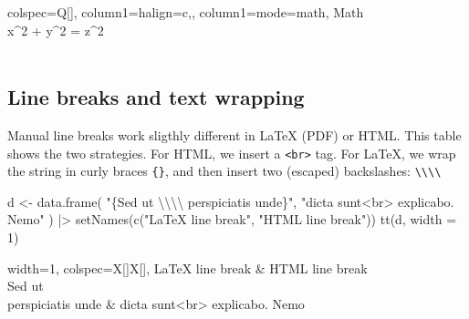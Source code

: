 \documentclass[
  letterpaper,
  DIV=11,
  numbers=noendperiod]{scrartcl}
\newenvironment{Shaded}{\begin{snugshade}}{\end{snugshade}}
\newcommand{\AttributeTok}[1]{\textcolor[rgb]{0.40,0.45,0.13}{#1}}
\newcommand{\DecValTok}[1]{\textcolor[rgb]{0.68,0.00,0.00}{#1}}
\newcommand{\FunctionTok}[1]{\textcolor[rgb]{0.28,0.35,0.67}{#1}}
\newcommand{\NormalTok}[1]{\textcolor[rgb]{0.00,0.23,0.31}{#1}}
\newcommand{\OtherTok}[1]{\textcolor[rgb]{0.00,0.23,0.31}{#1}}
\newcommand{\SpecialCharTok}[1]{\textcolor[rgb]{0.37,0.37,0.37}{#1}}
\newcommand{\StringTok}[1]{\textcolor[rgb]{0.13,0.47,0.30}{#1}}
\begin{document}
\begin{table}[H]
\centering
\begin{tblr}[         %
]                     %
{                     %
colspec={Q[]},
column{1}={halign=c,},
column{1}={mode=math},
}                     %
\toprule
Math \\ \midrule %
x^2 + y^2 = z^2 \\
    \\
\bottomrule
\end{tblr}
\end{table}

\subsection{Line breaks and text
wrapping}\label{line-breaks-and-text-wrapping}

Manual line breaks work sligthly different in LaTeX (PDF) or HTML. This
table shows the two strategies. For HTML, we insert a
\texttt{\textless{}br\textgreater{}} tag. For LaTeX, we wrap the string
in curly braces \texttt{\{\}}, and then insert two (escaped)
backslashes:
\texttt{\textbackslash{}\textbackslash{}\textbackslash{}\textbackslash{}}

\begin{Shaded}
\begin{Highlighting}[]
\NormalTok{d }\OtherTok{\textless{}{-}} \FunctionTok{data.frame}\NormalTok{(}
  \StringTok{"\{Sed ut }\SpecialCharTok{\textbackslash{}\textbackslash{}\textbackslash{}\textbackslash{}}\StringTok{ perspiciatis unde\}"}\NormalTok{,}
  \StringTok{"dicta sunt\textless{}br\textgreater{} explicabo. Nemo"}
\NormalTok{) }\SpecialCharTok{|\textgreater{}} \FunctionTok{setNames}\NormalTok{(}\FunctionTok{c}\NormalTok{(}\StringTok{"LaTeX line break"}\NormalTok{, }\StringTok{"HTML line break"}\NormalTok{))}
\FunctionTok{tt}\NormalTok{(d, }\AttributeTok{width =} \DecValTok{1}\NormalTok{)}
\end{Highlighting}
\end{Shaded}

\begin{table}[H]
\centering
\begin{tblr}[         %
]                     %
{                     %
width={1\linewidth},
colspec={X[]X[]},
}                     %
\toprule
LaTeX line break & HTML line break \\ \midrule %
{Sed ut \\ perspiciatis unde} & dicta sunt<br> explicabo. Nemo \\
\bottomrule
\end{tblr}
\end{table}
\end{document}
